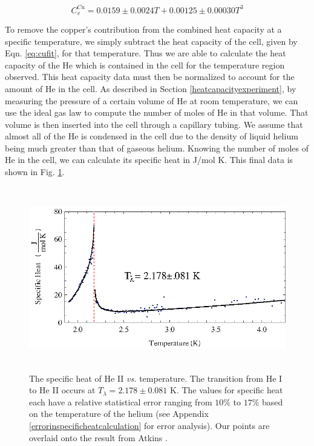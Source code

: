\begin{center}
\begin{equation}\label{eq:cufit}
C^{Cu}_{v} = 0.0159\pm0.0024 T+ 0.00125\pm0.00030 T^{3} 
\end{equation}
\end{center}

To remove the copper's contribution from the combined heat capacity at a specific temperature, we simply subtract the heat capacity of the cell, given by Eqn. \ref{eq:cufit}, for that temperature. Thus we are able to calculate the heat capacity of the He which is contained in the cell for the temperature region observed.  This heat capacity data must then be normalized to account for the amount of He in the cell. As described in Section \ref{heatcapacityexperiment}, by measuring the pressure of a certain volume of He at room temperature, we can use the ideal gas law to compute the number of moles of He in that volume.  That volume is then inserted into the cell through a capillary tubing.  We assume that almost all of the He is condensed in the cell due to the density of liquid helium being much greater than that of gaseous helium.  Knowing the number of moles of He in the cell, we can calculate its specific heat in J/mol K. This final data is shown in Fig. \ref{fig:lambdatrans}.
\begin{figure}[htbp]
\begin{center}
\includegraphics[height=80mm]{./figures/lambdatrans.eps}
\caption{\small{The specific heat of He II \emph{vs.} temperature. The transition from He I to He II occurs at $T_{\lambda} = 2.178 \pm 0.081$ K.  The values for specific heat each have a relative statistical error ranging from $10\%$  to $17\%$ based on the temperature of the helium (see Appendix \ref{errorinspecificheatcalculation} for error analysis). Our points are overlaid onto the result from Atkins \cite{atkins}.}}
\label{fig:lambdatrans}
\end{center}
\end{figure}

